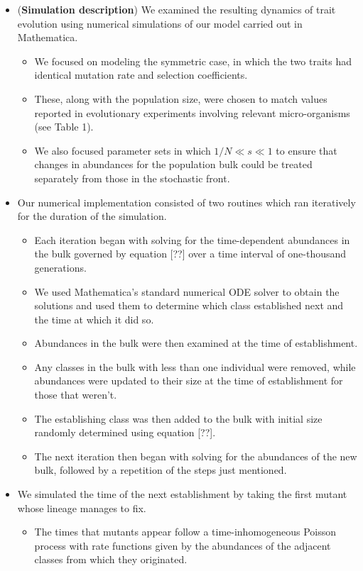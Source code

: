 \documentclass[11pt,one column]{article}
\begin{document}
\begin{itemize}
\begin{itemize}
	\end{itemize}
\item (\textbf{Simulation description}) We examined the resulting dynamics of trait evolution using numerical simulations of our model carried out in Mathematica.
	\begin{itemize}
	\item We focused on modeling the symmetric case, in which the two traits had identical mutation rate and selection coefficients.
	\item These, along with the population size, were chosen to match values reported in evolutionary experiments involving relevant micro-organisms (see Table 1).  
	\item We also focused parameter sets in which $1/N \ll s \ll 1$ to ensure that changes in abundances for the population bulk could be treated separately from those in the stochastic front.
	\end{itemize}
\item Our numerical implementation consisted of two routines which ran iteratively for the duration of the simulation.
	\begin{itemize}
	\item Each iteration began with solving for the time-dependent abundances in the bulk governed by equation [??] over a time interval of one-thousand generations.
	\item We used Mathematica's standard numerical ODE solver to obtain the solutions and used them to determine which class established next and the time at which it did so.
	\item Abundances in the bulk were then examined at the time of establishment.
	\item Any classes in the bulk with less than one individual were removed, while abundances were updated to their size at the time of establishment for those that weren't.
	\item The establishing class was then added to the bulk with initial size randomly determined using equation [??].
	\item The next iteration then began with solving for the abundances of the new bulk, followed by a repetition of the steps just mentioned.  
	\end{itemize}	
\item We simulated the time of the next establishment by taking the first mutant whose lineage manages to fix. 
	\begin{itemize}
	\item The times that mutants appear follow a time-inhomogeneous Poisson process with rate functions given by the abundances of the adjacent classes from which they originated. 

\end{itemize}
\end{itemize}
\end{document}

